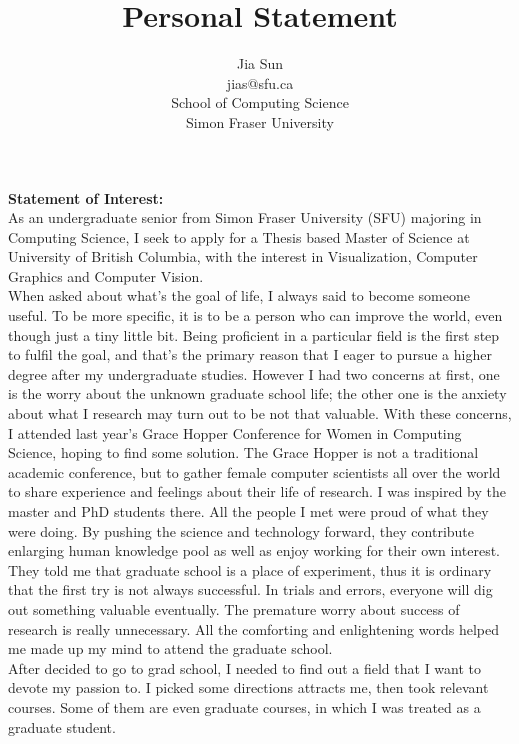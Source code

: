 \documentclass{article}
\title{Personal Statement}
\author{Jia Sun\\jias@sfu.ca\\School of Computing Science\\Simon Fraser University}
\begin{document}
\maketitle%

{\bf Statement of Interest:}\\

As an undergraduate senior from Simon Fraser University (SFU) majoring in Computing Science, I seek to apply for a Thesis based Master of Science at University of British Columbia, with the interest in Visualization, Computer Graphics and Computer Vision.\\



When asked about what's the goal of life, I always said to become someone useful. To be more specific, it is to be a person who can improve the world, even though just a tiny little bit. Being proficient in a particular field is the first step to fulfil the goal, and that's the primary reason that I eager to pursue a higher degree after my undergraduate studies. However I had two concerns at first, one is the worry about the unknown graduate school life; the other one is the anxiety about what I research may turn out to be not that valuable. With these concerns, I attended last year's Grace Hopper Conference for Women in Computing Science, hoping to find some solution. The Grace Hopper is not a traditional academic conference, but to gather female computer scientists all over the world to share experience and feelings about their life of research. I was inspired by the master and PhD students there. All the people I met were proud of what they were doing. By pushing the science and technology forward, they contribute enlarging human knowledge pool as well as enjoy working for their own interest. They told me that graduate school is a place of experiment, thus it is ordinary that the first try is not always successful. In trials and errors, everyone will dig out something valuable eventually. The premature worry about success of research is really unnecessary. All the comforting and enlightening words helped me made up my mind to attend the graduate school.  \\


After decided to go to grad school, I needed to find out a field that I want to devote my passion to. I picked some directions attracts me, then took relevant courses. Some of them are even graduate courses, in which I was treated as a graduate student.\\
\end{document}
